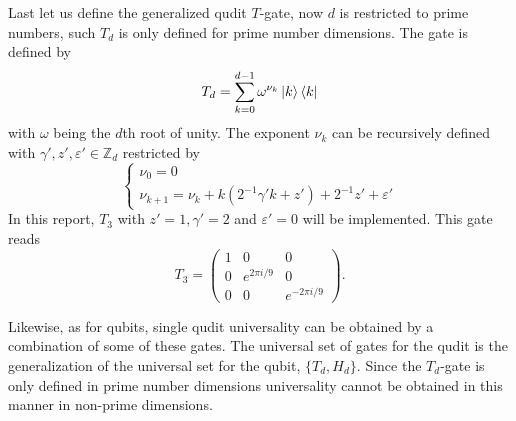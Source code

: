 Last let us define the generalized qudit $T$-gate, now $d$ is restricted to prime numbers, such $T_d$ is only defined for prime number dimensions\cite{8gate}. 
The gate is defined by
\begin{equation}
T_d = \sum_{k=0}^{d-1} \omega^{\nu_k}\ket{k}\bra{k}
\end{equation}
with $\omega$ being the $d$th root of unity. The exponent $\nu_k$ can be recursively defined with $\gamma',z',\varepsilon' \in \mathbb{Z}_d$ restricted by
\begin{equation}
\begin{cases}
\nu_0 = 0\\
\nu_{k+1} = \nu_k + k(2^{-1}\gamma'k + z') + 2^{-1}z' + \varepsilon'
\end{cases}
\end{equation} 
In this report, $T_3$ with $z' = 1, \gamma' = 2$ and $\varepsilon' = 0$ will be implemented. This gate reads 
\begin{equation}
T_3 = \begin{pmatrix}
1 & 0 & 0\\
0 & e^{2\pi i/9}& 0 \\
0 & 0 & e^{-2\pi i /9}
\end{pmatrix}.
\end{equation}

Likewise, as for qubits, single qudit universality can be obtained by a combination of some of these gates. The universal set of gates for the qudit is the generalization of the universal set for the qubit, $\{T_d, H_d\}$. Since the $T_d$-gate is only defined in prime number dimensions universality cannot be obtained in this manner in non-prime dimensions.




